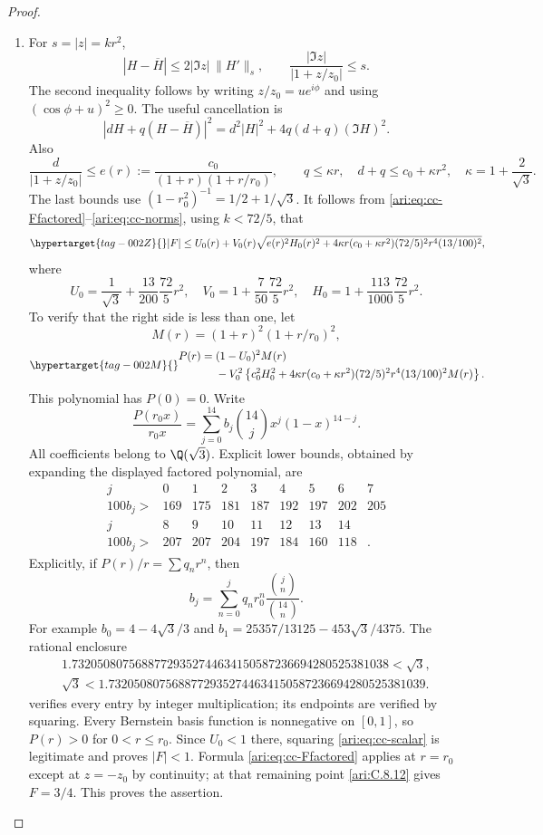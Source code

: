 \begin{proof}
\begin{enumerate}[label=\arabic*.,leftmargin=*]
\item For $s=|z|=kr^2$,
\[
 |H-\overline H|\le2|\Im z|\,\|H'\|_s,\qquad
 \frac{|\Im z|}{|1+z/z_0|}\le s.
\]
The second inequality follows by writing $z/z_0=ue^{i\phi}$
and using $(\cos\phi+u)^2\ge0$. The useful cancellation is
\[
 |dH+q(H-\overline H)|^2
      =d^2|H|^2+4q(d+q)(\Im H)^2.
\]
Also
\[
 \frac d{|1+z/z_0|}\le
 e(r):=\frac{c_0}{(1+r)(1+r/r_0)},\qquad
 q\le\kappa r,\quad d+q\le c_0+\kappa r^2,
 \quad\kappa=1+\frac2{\sqrt3}.
\]
The last bounds use $(1-r_0^2)^{-1}=1/2+1/\sqrt3$.
It follows from \eqref{ari:eq:cc-Ffactored}--\eqref{ari:eq:cc-norms},
using $k<72/5$, that
\begin{equation}\hypertarget{tag-002Z}{}\label{ari:eq:cc-scalar}
 |F|\le U_0(r)+V_0(r)
 \sqrt{e(r)^2H_0(r)^2+
       4\kappa r(c_0+\kappa r^2)(72/5)^2r^4(13/100)^2},
\end{equation}
where
\[
 U_0=\frac1{\sqrt3}+\frac{13}{200}\frac{72}{5}r^2,
 \quad V_0=1+\frac7{50}\frac{72}{5}r^2,
 \quad H_0=1+\frac{113}{1000}\frac{72}{5}r^2.
\]
To verify that the right side is less than one, let
\[
 M(r)=(1+r)^2(1+r/r_0)^2,
\]
\begin{equation}\hypertarget{tag-002M}{}\label{ari:eq:cc-P}
 \begin{aligned}
 P(r)={}&(1-U_0)^2M(r)\\
 &-V_0^2\left\{c_0^2H_0^2+
 4\kappa r(c_0+\kappa r^2)(72/5)^2r^4(13/100)^2M(r)\right\}.
 \end{aligned}
\end{equation}
This polynomial has $P(0)=0$. Write
\[
 \frac{P(r_0x)}{r_0x}
     =\sum_{j=0}^{14}b_j\binom{14}{j}x^j(1-x)^{14-j}.
\]
All coefficients belong to $\Q(\sqrt3)$. Explicit lower bounds,
obtained by expanding the displayed factored polynomial, are
\[
 \begin{array}{c|rrrrrrrr}
 j&0&1&2&3&4&5&6&7\\ \hline
 100b_j>&169&175&181&187&192&197&202&205\\[2pt]
 j&8&9&10&11&12&13&14&\\ \hline
 100b_j>&207&207&204&197&184&160&118&.
 \end{array}
\]
Explicitly, if $P(r)/r=\sum q_nr^n$,
then
\[
 b_j=\sum_{n=0}^j q_nr_0^n
                  \frac{\binom jn}{\binom{14}n}.
\]
For example $b_0=4-4\sqrt3/3$ and
$b_1=25357/13125-453\sqrt3/4375$. The rational enclosure
\[
 \begin{gathered}
 1.73205080756887729352744634150587236694280525381038<\sqrt3,\\
 \sqrt3<1.73205080756887729352744634150587236694280525381039.
 \end{gathered}
\]
verifies every entry by integer multiplication; its endpoints
are verified by squaring. Every Bernstein basis function is
nonnegative on $[0,1]$, so $P(r)>0$ for $0<r\le r_0$.
Since $U_0<1$ there, squaring \eqref{ari:eq:cc-scalar} is legitimate
and proves $|F|<1$. Formula \eqref{ari:eq:cc-Ffactored} applies
at $r=r_0$ except at $z=-z_0$ by continuity; at that remaining
point \ref{ari:C.8.12} gives $F=3/4$. This proves the assertion.
\end{enumerate}
\end{proof}